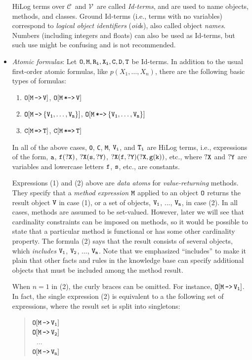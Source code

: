 \documentclass[11pt]{article}
\newcommand{\mvd}{{\mbox{\tt \,->\,}}}  %
\newcommand{\bmvd}{{\mbox{\tt \,*->\,}}}              %
\newcommand{\Mvd}{{\mbox{\tt \,=>\,}}}  %
\newcommand{\bMvd}{{\mbox{\tt \,*=>\,}}}  %
\newcommand{\fl}{\mbox{F-logic}\xspace}
\newcommand{\consts}{\ensuremath{\mathcal{C}}\xspace}
\newcommand{\vars}{\ensuremath{\mathcal{V}}\xspace}
\begin{document}
\begin{itemize}
    HiLog terms over \consts\ and \vars\ are called \emph{Id-terms},
    and are used to name objects, methods, and classes.  Ground Id-terms
    (i.e., terms with no variables) correspond to \emph{logical
      object identifiers} (\emph{oid}s), also called object \emph{names}.
    Numbers (including integers and floats) can also be used as Id-terms,
    but such use might be confusing and is not recommended.
  \index{atomic formula!in \fl}
\item \emph{Atomic formulas}: Let $\tt O,M,R_{i},X_{i},C,D,T$ be Id-terms.  In
  addition to the usual first-order atomic formulas, like
  $p(X_1,\dots,X_n)$, there are the following basic types of formulas:
  \medskip

  \begin{enumerate}
    \item \label{eq-value-atom} $\tt O[M\mvd V]$, $\tt O[M\bmvd V]$
    \item $\tt O[M\mvd \{V_1,\dots,V_n\}]$, $\tt O[M\bmvd \{V_1,\dots,V_n\}]$
    \item $\tt C[M\Mvd T]$, $\tt C[M\bMvd T]$
  \end{enumerate}
  
  In all of the above cases, {\tt O}, {\tt C}, {\tt M}, ${\tt V_i}$, and
  ${\tt T_i}$ are HiLog terms, i.e., expressions of the form, $\tt a$,
  $\tt f(?X)$, $\tt ?X(s,?Y)$, $\tt ?X(f,?Y)(?X,g(k))$, etc., where $\tt ?X$
  and $\tt ?Y$ are variables and lowercase letters $\tt f$, $\tt s$, etc., are
  constants.
  
  Expressions (1) and (2) above are \emph{data atoms} for
  \emph{value-returning} methods. They specify that a
  \emph{method expression} $\tt M$ applied to an object $\tt O$ returns the
  result object $\tt V$ in case (1), or a set of objects, $\tt V_1$, ...,
  $\tt V_n$, in case (2). In all cases, methods are assumed to be
  set-valued. However, later we will see that cardinality
  constraints can be imposed on methods, so it would be possible to state
  that a particular method is functional or has some other cardinality
  property.
  The formula (2) says that
  the result consists of several objects, which \emph{includes} $\tt V_1$,
  $\tt V_2$, ..., $\tt V_n$. Note that we emphasized ``includes''
  to make it plain that other facts and rules in the knowledge base can specify
  additional objects that must be included among the method result.
  
  When $n=1$ in (2), the curly braces can be omitted. For
  instance, $\tt O[M\mvd V_1]$. In fact, the single expression (2) is
  equivalent to a the following set of expressions, where the result set is
  split into singletons:
  \begin{quote}
  $\tt O[M\mvd V_1]$    \\
  $\tt O[M\mvd V_2]$    \\
  $~~~\dots$\\
  $\tt O[M\mvd V_n]$
  \end{quote}
  

\end{itemize}
\end{document}
